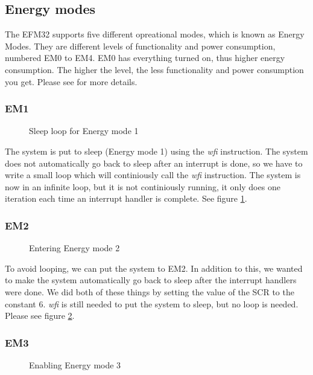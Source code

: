 	\subsection{Energy modes}
	The EFM32 supports five different opreational modes, which is known as Energy Modes. They are different levels of functionality and power consumption, numbered EM0 to EM4. EM0 has everything turned on, thus higher energy consumption. The higher the level, the less functionality and power consumption you get. Please see \cite[p. 2]{energy_optimization_application_note} for more details. 

	\subsubsection{EM1}
	\label{subsubsection:em1}

	\begin{figure}[t]
		
		\caption{Sleep loop for Energy mode 1}
		\label{code:em1}
	\end{figure}
	The system is put to sleep (Energy mode 1) using the \emph{wfi} instruction. The system does not automatically go back to sleep after an interrupt is done, so we have to write a small loop which will continiously call the \emph{wfi} instruction. The system is now in an infinite loop, but it is not continiously running, it only does one iteration each time an interrupt handler is complete. See figure \ref{code:em1}.

	\subsubsection{EM2}
	\label{subsubsection:em2}
	
	\begin{figure}[t]
		
		\caption{Entering Energy mode 2}
		\label{code:wfi_scr}
	\end{figure}

	To avoid looping, we can put the system to EM2. In addition to this, we  wanted to make the system automatically go back to sleep after the interrupt handlers were done. We did both of these things by setting the value of the SCR to the constant $6$. \emph{wfi} is still needed to put the system to sleep, but no loop is needed. Please see figure \ref{code:wfi_scr}.

		\subsubsection{EM3}
		\label{subsubsection:em3}	
		\begin{figure}[t]
			
			\caption{Enabling Energy mode 3}
			\label{code:em3}
		\end{figure}

